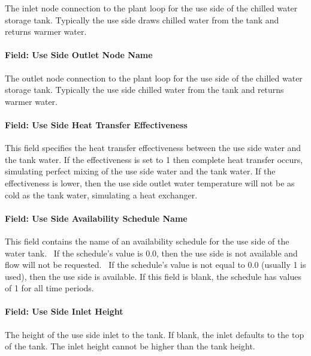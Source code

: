 The inlet node connection to the plant loop for the use side of the chilled
water storage tank. Typically the use side draws chilled water from the tank and
returns warmer water.

\paragraph{Field: Use Side Outlet Node
Name}\label{field-use-side-outlet-node-name-thermalstoragehotwaterstratified}

The outlet node connection to the plant loop for the use side of the chilled
water storage tank. Typically the use side chilled water from the tank and
returns warmer water.

\paragraph{Field: Use Side Heat Transfer
Effectiveness}\label{field-use-side-heat-transfer-effectiveness-thermalstoragehotwaterstratified}

This field specifies the heat transfer effectiveness between the use side water
and the tank water. If the effectiveness is set to 1 then complete heat transfer
occurs, simulating perfect mixing of the use side water and the tank water. If
the effectiveness is lower, then the use side outlet water temperature will not
be as cold as the tank water, simulating a heat exchanger.

\paragraph{Field: Use Side Availability Schedule
Name}\label{field-use-side-availability-schedule-name-thermalstoragehotwaterstratified}

This field contains the name of an availability schedule for the use side of the
water tank.~ If the schedule's value is 0.0, then the use side is not available
and flow will not be requested.~ If the schedule's value is not equal to 0.0
(usually 1 is used), then the use side is available. If this field is blank, the
schedule has values of 1 for all time periods.

\paragraph{Field: Use Side Inlet Height}\label{field-use-side-inlet-height-thermalstoragehotwaterstratified}

The height of the use side inlet to the tank. If blank, the inlet defaults to
the top of the tank. The inlet height cannot be higher than the tank height.

